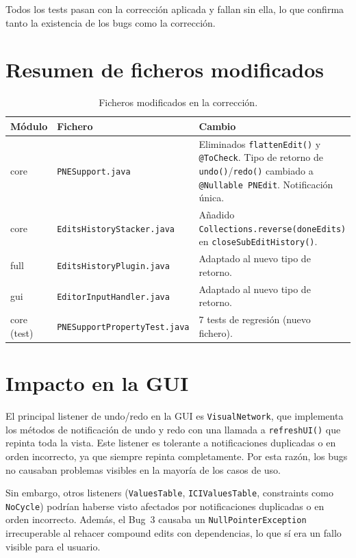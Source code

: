 \documentclass[12pt,a4paper]{article}
\newcommand{\code}[1]{\texttt{#1}}
\newcommand{\clase}[1]{\texttt{#1}}
\newcommand{\metodo}[1]{\texttt{#1}}
\begin{document}
Todos los tests pasan con la corrección aplicada y fallan sin ella, lo que
confirma tanto la existencia de los bugs como la corrección.


\section{Resumen de ficheros modificados}

\begin{table}[H]
\centering
\caption{Ficheros modificados en la corrección.}
\label{tab:ficheros}
\small
\begin{tabularx}{\textwidth}{llX}
\toprule
\textbf{Módulo} & \textbf{Fichero} & \textbf{Cambio} \\
\midrule
core & \code{PNESupport.java} &
  Eliminados \metodo{flattenEdit()} y \code{@ToCheck}.
  Tipo de retorno de \metodo{undo()}/\metodo{redo()} cambiado a
  \code{@Nullable PNEdit}. Notificación única. \\
\addlinespace
core & \code{EditsHistoryStacker.java} &
  Añadido \code{Collections.reverse(doneEdits)} en
  \metodo{closeSubEditHistory()}. \\
\addlinespace
full & \code{EditsHistoryPlugin.java} &
  Adaptado al nuevo tipo de retorno. \\
\addlinespace
gui & \code{EditorInputHandler.java} &
  Adaptado al nuevo tipo de retorno. \\
\addlinespace
core (test) & \code{PNESupportPropertyTest.java} &
  7 tests de regresión (nuevo fichero). \\
\bottomrule
\end{tabularx}
\end{table}


\section{Impacto en la GUI}

El principal listener de undo/redo en la GUI es \clase{VisualNetwork}, que
implementa los métodos de notificación de undo y redo con una llamada a
\metodo{refreshUI()} que repinta toda la vista. Este listener es tolerante
a notificaciones duplicadas o en orden incorrecto, ya que siempre repinta
completamente. Por esta razón, los bugs no causaban problemas visibles en
la mayoría de los casos de uso.

\medskip

Sin embargo, otros listeners (\clase{ValuesTable}, \clase{ICIValuesTable},
constraints como \clase{NoCycle}) podrían haberse visto afectados por
notificaciones duplicadas o en orden incorrecto. Además, el Bug~3 causaba
un \code{NullPointerException} irrecuperable al rehacer compound edits con
dependencias, lo que sí era un fallo visible para el usuario.
\end{document}
